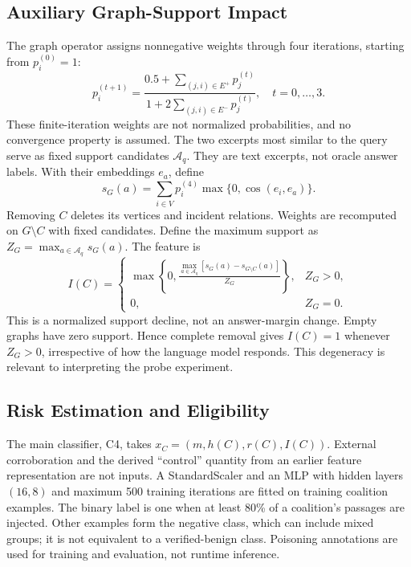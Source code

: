 \documentclass[sigconf]{aamas}
\begin{document}
\subsection{Auxiliary Graph-Support Impact}
\label{sec:impact}
The graph operator assigns nonnegative weights through four iterations, starting from $p_i^{(0)}=1$:
\begin{equation}
p_i^{(t+1)}=\frac{0.5+\sum_{(j,i)\in E^+}p_j^{(t)}}{1+2\sum_{(j,i)\in E^-}p_j^{(t)}},\quad t=0,\ldots,3.
\end{equation}
These finite-iteration weights are not normalized probabilities, and no convergence property is assumed. The two excerpts most similar to the query serve as fixed support candidates $\mathcal{A}_q$. They are text excerpts, not oracle answer labels. With their embeddings $e_a$, define
\begin{equation}
s_G(a)=\sum_{i\in V}p_i^{(4)}\max\{0,\cos(e_i,e_a)\}.
\end{equation}
Removing $C$ deletes its vertices and incident relations. Weights are recomputed on $G\setminus C$ with fixed candidates. Define the maximum support as $Z_G=\max_{a\in\mathcal{A}_q}s_G(a)$. The feature is
\begin{equation}
I(C)=\begin{cases}
\displaystyle\max\left\{0,\frac{\max_{a\in\mathcal{A}_q}[s_G(a)-s_{G\setminus C}(a)]}{Z_G}\right\},&Z_G>0,\\
0,&Z_G=0.
\end{cases}
\label{eq:impact}
\end{equation}
This is a normalized support decline, not an answer-margin change. Empty graphs have zero support. Hence complete removal gives $I(C)=1$ whenever $Z_G>0$, irrespective of how the language model responds. This degeneracy is relevant to interpreting the probe experiment.

\subsection{Risk Estimation and Eligibility}
The main classifier, C4, takes $x_C=(m,h(C),r(C),I(C))$. External corroboration and the derived ``control'' quantity from an earlier feature representation are not inputs. A StandardScaler and an MLP with hidden layers $(16,8)$ and maximum 500 training iterations are fitted on training coalition examples. The binary label is one when at least 80\% of a coalition's passages are injected. Other examples form the negative class, which can include mixed groups; it is not equivalent to a verified-benign class. Poisoning annotations are used for training and evaluation, not runtime inference.
\end{document}
